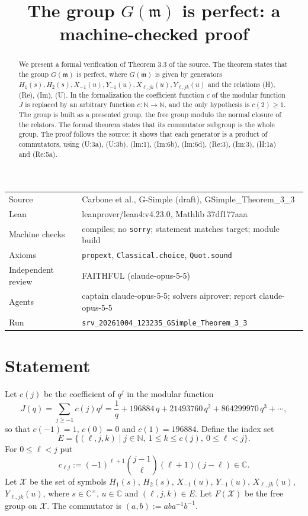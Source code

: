 \documentclass[11pt]{article}
\title{The group $G(\mathfrak m)$ is perfect: a machine-checked proof}
\date{}
\theoremstyle{definition}
\theoremstyle{remark}
\newcommand{\Cx}{\mathbb{C}^\times}
\begin{document}
\maketitle
\begin{abstract}
We present a formal verification of Theorem 3.3 of the source. The theorem states that the group $G(\mathfrak m)$ is perfect, where $G(\mathfrak m)$ is given by generators $H_1(s),H_2(s),X_{-1}(u),Y_{-1}(u),X_{\ell,jk}(u),Y_{\ell,jk}(u)$ and the relations (H), (Re), (Im), (U). In the formalization the coefficient function $c$ of the modular function $J$ is replaced by an arbitrary function $c:\mathbb N\to\mathbb N$, and the only hypothesis is $c(2)\ge 1$. The group is built as a presented group, the free group modulo the normal closure of the relators. The formal theorem states that its commutator subgroup is the whole group. The proof follows the source: it shows that each generator is a product of commutators, using (U:3a), (U:3b), (Im:1), (Im:6b), (Im:6d), (Re:3), (Im:3), (H:1a) and (Re:5a).
\end{abstract}

\begin{center}\small
\begin{tabular}{@{}ll@{}}
\toprule
Source & Carbone et al., G-Simple (draft), GSimple\_Theorem\_3\_3 \\
Lean & leanprover/lean4:v4.23.0, Mathlib 37df177aaa \\
Machine checks & compiles; no \texttt{sorry}; statement matches target; module build \\
Axioms & \texttt{propext}, \texttt{Classical.choice}, \texttt{Quot.sound} \\
Independent review & FAITHFUL (claude-opus-5-5) \\
Agents & captain claude-opus-5-5; solvers aiprover; report claude-opus-5-5 \\
Run & \texttt{srv\_20261004\_123235\_GSimple\_Theorem\_3\_3} \\
\bottomrule
\end{tabular}
\end{center}

\tableofcontents

\section{Statement}

Let $c(j)$ be the coefficient of $q^j$ in the modular function
\[
J(q)=\sum_{j\ge -1}c(j)q^j=\frac1q+196884\,q+21493760\,q^2+864299970\,q^3+\cdots,
\]
so that $c(-1)=1$, $c(0)=0$ and $c(1)=196884$. Define the index set
\[
E=\{(\ell,j,k)\mid j\in\mathbb N,\ 1\le k\le c(j),\ 0\le \ell<j\}.
\]
For $0\le \ell<j$ put
\[
c_{\ell j}:=(-1)^{\ell+1}\binom{j-1}{\ell}(\ell+1)(j-\ell)\in\mathbb C.
\]
Let $\mathcal X$ be the set of symbols $H_1(s)$, $H_2(s)$, $X_{-1}(u)$, $Y_{-1}(u)$, $X_{\ell,jk}(u)$, $Y_{\ell,jk}(u)$, where $s\in\Cx$, $u\in\mathbb C$ and $(\ell,j,k)\in E$. Let $F(\mathcal X)$ be the free group on $\mathcal X$. The commutator is $(a,b):=aba^{-1}b^{-1}$.
\end{document}
